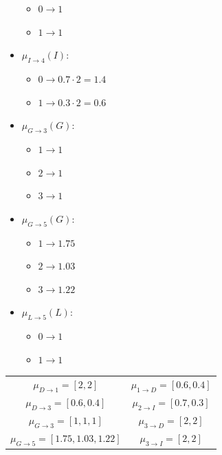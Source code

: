 \begin{example}
\begin{itemize}
            \begin{itemize}
                \item $0 \rightarrow 1$
                \item $1 \rightarrow 1$
            \end{itemize}
        \item $\mu_{I \rightarrow 4}(I)$:
            \begin{itemize}
                \item $0 \rightarrow 0.7 \cdot 2=1.4$
                \item $1 \rightarrow 0.3 \cdot 2=0.6$
            \end{itemize}
        \item $\mu_{G \rightarrow 3}(G)$:
            \begin{itemize}
                \item $1 \rightarrow 1$
                \item $2 \rightarrow 1$
                \item $3 \rightarrow 1$
            \end{itemize}
        \item $\mu_{G \rightarrow 5}(G)$:
            \begin{itemize}
                \item $1 \rightarrow 1.75$
                \item $2 \rightarrow 1.03$
                \item $3 \rightarrow 1.22$
            \end{itemize}
        \item $\mu_{L \rightarrow 5}(L)$:
            \begin{itemize}
                \item $0 \rightarrow 1$
                \item $1 \rightarrow 1$
            \end{itemize}
    \end{itemize}
    \begin{table}[H]
        \centering
        \begin{tabular}{cc}
        \hline
        $\mu_{D \rightarrow 1}=[2,2]$ & $\mu_{1 \rightarrow D}=[0.6,0.4]$   \\
        $\mu_{D \rightarrow 3}=[0.6,0.4]$ & $\mu_{2 \rightarrow I}=[0.7,0.3]$   \\
        $\mu_{G \rightarrow 3}=[1,1,1]$ & $\mu_{3 \rightarrow D}=[2,2]$   \\
        $\mu_{G \rightarrow 5}=[1.75,1.03,1.22]$ & $\mu_{3 \rightarrow I}=[2,2]$   \\

\end{tabular}
\end{table}
\end{example}
